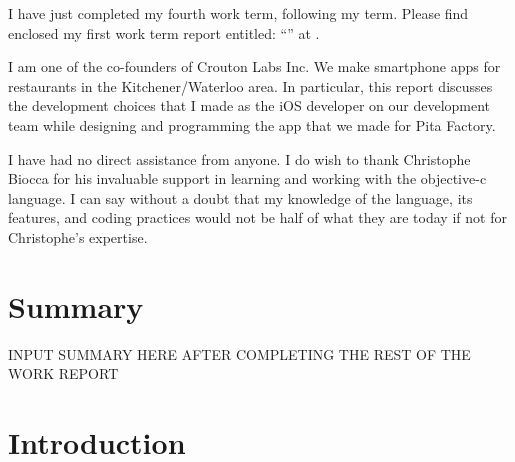 \documentclass[se]{uw-wkrpt}
\begin{document}
\begin{letter}
I have just completed my fourth work term, following my \theterm{} term.
Please find enclosed my first work term report entitled:
``\thetitle'' at \theemployer.  

I am one of the co-founders of Crouton Labs Inc. We make smartphone
apps for restaurants in the Kitchener/Waterloo area. In particular, this
report discusses the development choices that I made as the iOS developer
on our development team while designing and programming the app that we
made for Pita Factory.

I have had no direct assistance from anyone.  I do wish to thank Christophe
Biocca for his invaluable support in learning and working with the objective-c
language. I can say without a doubt that my knowledge of the language, its features,
and coding practices would not be half of what they are today if not for Christophe's
expertise.

\end{letter}

\tableofcontents
\listoffigures
\listoftables

\section{Summary}

INPUT SUMMARY HERE AFTER COMPLETING THE REST OF THE WORK REPORT



\mainmatter

\section{Introduction}\label{sec:intro}
\end{document}

